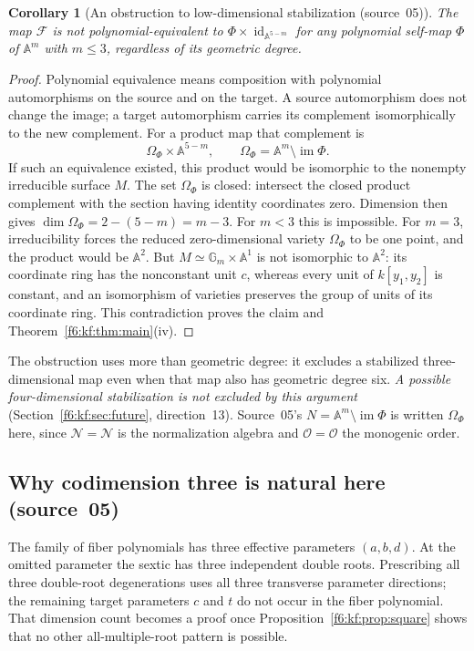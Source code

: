 \documentclass[11pt,a4paper]{article}
\newtheorem{corollary}[theorem]{Corollary}
\theoremstyle{definition}
\newcommand{\A}{\mathbb A}
\newcommand{\Gm}{\mathbb G_m}
\newcommand{\id}{\operatorname{id}}
\newcommand{\F}{\mathcal F}
\newcommand{\normal}{\mathcal N}
\newcommand{\ord}{\mathcal O}
\newcommand{\im}{\operatorname{im}}
\newcommand{\src}[1]{\textup{(source~#1)}}
\begin{document}
\begin{corollary}[An obstruction to low-dimensional stabilization \src{05}]
\label{f6:kf:cor:nostabilization}
The map $\F$ is not polynomial-equivalent to
$\Phi\times\id_{\A^{5-m}}$ for any polynomial self-map $\Phi$ of $\A^m$
with $m\le3$, regardless of its geometric degree.
\end{corollary}
\begin{proof}
Polynomial equivalence means composition with polynomial automorphisms on the
source and on the target. A source automorphism does not change the image;
a target automorphism carries its complement isomorphically to the new
complement. For a product map that complement is
\[
\Omega_\Phi\times\A^{5-m},\qquad \Omega_\Phi=\A^m\setminus\im\Phi .
\]
If such an equivalence existed, this product would be isomorphic to the
nonempty irreducible surface $M$. The set $\Omega_\Phi$ is closed:
intersect the closed product complement with the section having identity
coordinates zero. Dimension then gives $\dim\Omega_\Phi=2-(5-m)=m-3$.
For $m<3$ this is impossible. For $m=3$, irreducibility forces the reduced
zero-dimensional variety $\Omega_\Phi$ to be one point, and the product
would be $\A^2$. But $M\simeq\Gm\times\A^1$ is not isomorphic to $\A^2$: its
coordinate ring has the nonconstant unit $c$, whereas every unit of
$k[y_1,y_2]$ is constant, and an isomorphism of varieties preserves the group
of units of its coordinate ring. This contradiction proves the claim and
Theorem~\ref{f6:kf:thm:main}(iv).
\end{proof}

The obstruction uses more than geometric degree: it excludes a stabilized
three-dimensional map even when that map also has geometric degree six.
\emph{A possible four-dimensional stabilization is not excluded by this
argument} (Section~\ref{f6:kf:sec:future}, direction~13). Source~05's
$N=\A^m\setminus\im\Phi$ is written $\Omega_\Phi$ here, since $\normal=\mathcal N$
is the normalization algebra and $\ord=\mathcal O$ the monogenic order.

\subsection{Why codimension three is natural here \src{05}}
The family of fiber polynomials has three effective parameters $(a,b,d)$. At
the omitted parameter the sextic has three independent double roots.
Prescribing all three double-root degenerations uses all three transverse
parameter directions; the remaining target parameters $c$ and $t$ do not
occur in the fiber polynomial. That dimension count becomes a proof once
Proposition~\ref{f6:kf:prop:square} shows that no other all-multiple-root
pattern is possible.
\end{document}
